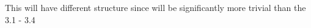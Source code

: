 \documentclass[../main.tex]{subfiles}
\begin{document}
This will have different structure since will be significantly more trivial than the 3.1 - 3.4
\end{document}
